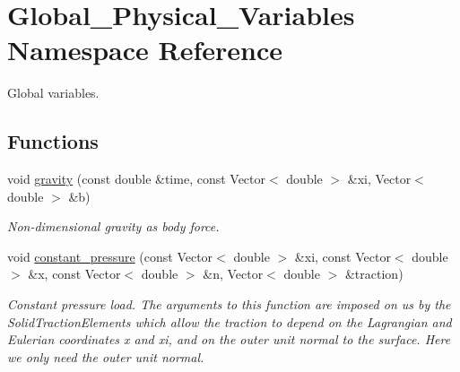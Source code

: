 \hypertarget{namespaceGlobal__Physical__Variables}{}\section{Global\+\_\+\+Physical\+\_\+\+Variables Namespace Reference}
\label{namespaceGlobal__Physical__Variables}


Global variables.  


\subsection*{Functions}
\begin{DoxyCompactItemize}
\item 
void \hyperlink{namespaceGlobal__Physical__Variables_a0777aef63372db7f91ad894c38159681}{gravity} (const double \&time, const Vector$<$ double $>$ \&xi, Vector$<$ double $>$ \&b)
\begin{DoxyCompactList}\small\item\em Non-\/dimensional gravity as body force. \end{DoxyCompactList}\item 
void \hyperlink{namespaceGlobal__Physical__Variables_a19f4e20a92e7d216b4d2b00308f96917}{constant\+\_\+pressure} (const Vector$<$ double $>$ \&xi, const Vector$<$ double $>$ \&x, const Vector$<$ double $>$ \&n, Vector$<$ double $>$ \&traction)
\begin{DoxyCompactList}\small\item\em Constant pressure load. The arguments to this function are imposed on us by the Solid\+Traction\+Elements which allow the traction to depend on the Lagrangian and Eulerian coordinates x and xi, and on the outer unit normal to the surface. Here we only need the outer unit normal. \end{DoxyCompactList}\end{DoxyCompactItemize}
